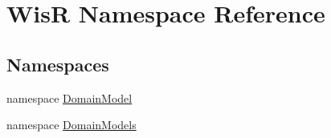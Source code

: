 \hypertarget{namespace_wis_r}{}\section{Wis\+R Namespace Reference}
\label{namespace_wis_r}
\subsection*{Namespaces}
\begin{DoxyCompactItemize}
\item 
namespace \hyperlink{namespace_wis_r_1_1_domain_model}{Domain\+Model}
\item 
namespace \hyperlink{namespace_wis_r_1_1_domain_models}{Domain\+Models}
\end{DoxyCompactItemize}
